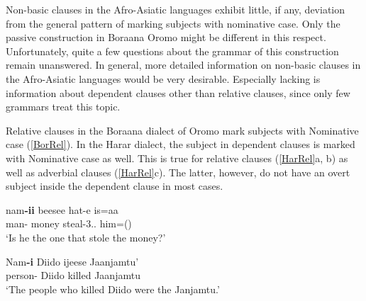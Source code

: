 Non-basic clauses in the Afro-Asiatic languages exhibit little, if any, deviation from the general pattern of marking subjects with nominative  case.
Only the passive construction in Boraana Oromo might be different in this respect. 
Unfortunately, quite a few questions about the grammar of this construction remain unanswered. 
In general, more detailed information on non-basic clauses in the Afro-Asiatic languages would be very desirable.
Especially lacking is information about dependent clauses other than relative clauses, since only few grammars treat this topic. 

Relative clauses in the Boraana dialect of Oromo mark subjects with Nominative  case (\ref{BorRel}).
In the Harar dialect, the subject in dependent clauses is marked with Nominative  case as well.
This is true for relative clauses (\ref{HarRel}a, b) as well as adverbial clauses (\ref{HarRel}c). 
The latter, however, do not have an overt subject inside the dependent clause in most cases.

\begin{exe}\ex\label{BorRel}
\begin{xlist}
\ex \gll nam\textbf{-ii} beesee hat-e is=aa\\
man-\nom{} money steal-3\sg{}.\mas{}.\pst{} him=\lin{}(\question{})\\
\glt `Is he the one that stole the money?'

\ex \gll Nam\textbf{-i} Diido ijeese Jaanjamtu'\\
person-\nom{} Diido killed Jaanjamtu\\
\glt `The people who killed Diido were the Janjamtu.' %
\end{xlist}
\end{exe}

